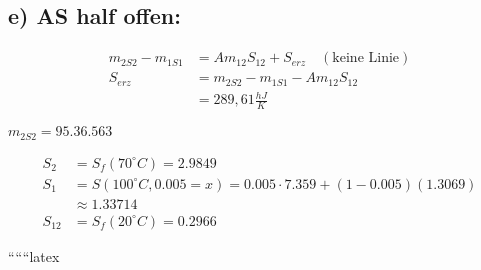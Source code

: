 \subsection*{e) AS half offen:}

\begin{align*}
    m_{2S2} - m_{1S1} &= Am_{12}S_{12} + S_{erz} \quad (\text{keine Linie}) \\
    S_{erz} &= m_{2S2} - m_{1S1} - Am_{12}S_{12} \\
    &= 289,61 \frac{hJ}{K}
\end{align*}

\noindent
$m_{2S2} = 95.36.563$

\begin{align*}
    S_2 &= S_f(70^\circ C) = 2.9849 \\
    S_1 &= S(100^\circ C, 0.005 = x) = 0.005 \cdot 7.359 + (1 - 0.005)(1.3069) \\
    &\approx 1.33714 \\
    S_{12} &= S_f(20^\circ C) = 0.2966
\end{align*}

``````latex


